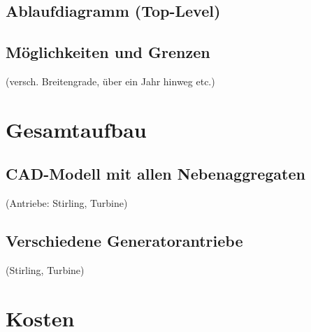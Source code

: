 \documentclass[fontsize=10pt,paper=a4,bibliography=totoc]{scrartcl}
\newcommand{\maxim}[1]{{ \color{blue} #1}}
\begin{document}
\subsection{Ablaufdiagramm (Top-Level)}
\maxim{

}
\subsection{Möglichkeiten und Grenzen}
 (versch. Breitengrade, über ein Jahr hinweg etc.)
\section{Gesamtaufbau}
\subsection{CAD-Modell mit allen Nebenaggregaten}
 (Antriebe: Stirling, Turbine)
\subsection{Verschiedene Generatorantriebe}
 (Stirling, Turbine)
\section{Kosten}
\end{document}
